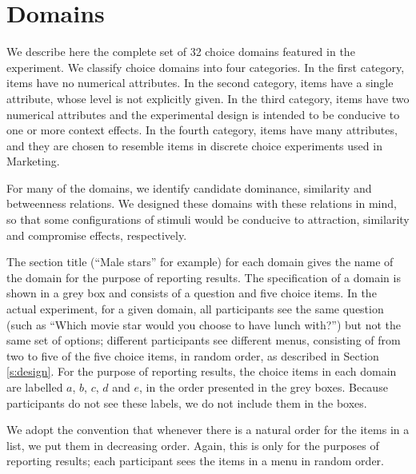 \documentclass[11pt,letter]{article}
\newcommand{\menu}{menu}
\newcommand{\menus}{menus}
\begin{document}

\section{Domains}\label{s:domains}

We describe here the complete set of 32 choice domains featured in the experiment.
We classify choice domains into four categories.
In the first category, items have no numerical attributes.
In the second category, items have a single attribute, whose level is not explicitly given.
In the third category, items have two numerical attributes and the experimental design is intended to be conducive to one or more context effects.
In the fourth category, items have many attributes, and they are chosen to resemble items in discrete choice experiments used in Marketing.

For many of the domains, we identify candidate dominance, similarity and betweenness relations.
We designed these domains with these relations in mind, so that some configurations of stimuli would be conducive to attraction, similarity and compromise effects, respectively.

The section title (``Male stars'' for example) for each domain gives the name of the domain for the purpose of reporting results.
The specification of a domain is shown in a grey box and consists of a question and five choice items.
In the actual experiment, for a given domain, all participants see the same question (such as ``Which movie star would you choose to have lunch with?'') but not the same set of options; different participants see different \menus{}, consisting of from two to five of the five choice items, in random order, as described in Section \ref{s:design}.
For the purpose of reporting results, the choice items in each domain are labelled $a$, $b$, $c$, $d$ and $e$, in the order presented in the grey boxes.
Because participants do not see these labels, we do not include them in the boxes.

We adopt the convention that whenever there is a natural order for the items in a list, we put them in decreasing order.
Again, this is only for the purposes of reporting results; each participant sees the items in a \menu{} in random order.
\end{document}
